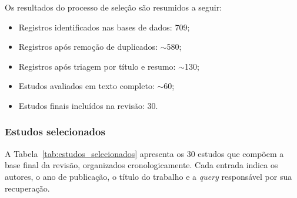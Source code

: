 \documentclass[
	12pt,				%
	openright,			%
	oneside,			%
	a4paper,			%
	english,			%
	french,				%
	spanish,			%
	brazil,				%
	]{abntex2}
\begin{document}
Os resultados do processo de seleção são resumidos a seguir:

\begin{itemize}
    \item Registros identificados nas bases de dados: 709;
    \item Registros após remoção de duplicados: $\sim$580;
    \item Registros após triagem por título e resumo: $\sim$130;
    \item Estudos avaliados em texto completo: $\sim$60;
    \item Estudos finais incluídos na revisão: 30.
\end{itemize}

\subsubsection{Estudos selecionados}

A Tabela~\ref{tab:estudos_selecionados} apresenta os 30 estudos que compõem a base final da revisão, organizados cronologicamente. Cada entrada indica os autores, o ano de publicação, o título do trabalho e a \textit{query} responsável por sua recuperação.
\end{document}
